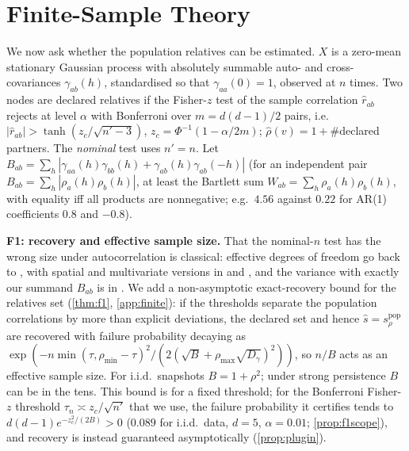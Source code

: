 \documentclass{article}
\theoremstyle{plain}
\theoremstyle{definition}
\theoremstyle{remark}
\newcommand{\srho}{s_\rho}
\begin{document}
\section{Finite-Sample Theory}
\label{sec:finite}

We now ask whether the population relatives can be estimated. $X$ is a
zero-mean stationary Gaussian process with absolutely summable auto- and
cross-covariances $\gamma_{ab}(h)$, standardised so that $\gamma_{aa}(0)=1$,
observed at $n$ times. Two nodes are declared relatives if the Fisher-$z$ test
of the sample correlation $\hat r_{ab}$ rejects at level $\alpha$ with
Bonferroni over $m=d(d{-}1)/2$ pairs, i.e. $|\hat r_{ab}|>\tanh(z_c/\sqrt{n'-3})$,
$z_c=\Phi^{-1}(1-\alpha/2m)$; $\hat\rho(v)=1+\#$declared partners. The
\emph{nominal} test uses $n'=n$. Let
$B_{ab}=\sum_h|\gamma_{aa}(h)\gamma_{bb}(h)+\gamma_{ab}(h)\gamma_{ab}(-h)|$
(for an independent pair $B_{ab}=\sum_h|\rho_a(h)\rho_b(h)|$, at least the
Bartlett sum $W_{ab}=\sum_h\rho_a(h)\rho_b(h)$, with equality iff all products
are nonnegative; e.g.\ $4.56$ against $0.22$ for AR(1) coefficients $0.8$ and
$-0.8$).

\textbf{F1: recovery and effective sample size.} That the nominal-$n$ test has
the wrong size under autocorrelation is classical: effective degrees of
freedom go back to \citet{bartlett1935}, with spatial and multivariate versions
in \citet{clifford1989} and \citet{roy1989}, and the variance with exactly our
summand $B_{ab}$ is in \citet{afyouni2019effective}. We add a non-asymptotic
exact-recovery bound for the relatives set (\cref{thm:f1}, \cref{app:finite}):
if the thresholds separate the population correlations by more than explicit
deviations, the declared set and hence $\hat s=\srho^{\mathrm{pop}}$ are
recovered with failure probability decaying as
$\exp(-n\min(\tau,\rho_{\min}-\tau)^2/(2(\sqrt B+\rho_{\max}\sqrt{D_\gamma})^2))$,
so $n/B$ acts as an effective sample size. For i.i.d.\ snapshots $B=1+\rho^2$;
under strong persistence $B$ can be in the tens. This bound is for a fixed
threshold; for the Bonferroni Fisher-$z$ threshold $\tau_n\asymp z_c/\sqrt{n'}$
that we use, the failure probability it certifies tends to
$d(d{-}1)e^{-z_c^2/(2B)}>0$ ($0.089$ for i.i.d.\ data, $d=5$, $\alpha=0.01$;
\cref{prop:f1scope}), and recovery is instead guaranteed asymptotically
(\cref{prop:plugin}).
\end{document}
